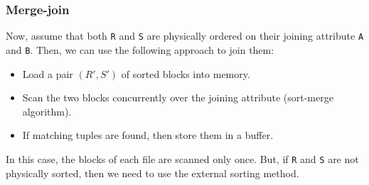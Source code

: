\documentclass[a4paper, openany]{memoir}
\theoremstyle{definition}
\theoremstyle{plain}
\newcommand{\tuplesorted}[0]{
    \draw (0, 0) -- (1.5, 0)
    -- (1.5, -4)
    -- (0, -4)
    -- cycle;

    \foreach \x/\y[count=\i] in {1/2, 2/3, 2/5, 3/8, 5/9, 5/11, 5/12, 6/13} {
        \draw (0.75, -\i*0.5) -- (0.75, -\i*0.5 + 0.5);
        \draw (0, -\i*0.5) -- (1.5, -\i*0.5);
        \filldraw[blue!30, opacity=0.3] (0.75, -\i*0.5) -- (1.5, -\i*0.5)
            -- (1.5, -\i*0.5 + 0.5)
            -- (0.75, -\i*0.5 + 0.5)
            -- cycle;
        \filldraw[red!30, opacity=0.3] (0.75, -\i*0.5) -- (0, -\i*0.5)
            -- (0, -\i*0.5 + 0.5)
            -- (0.75, -\i*0.5 + 0.5)
            -- cycle;
        \node at (0.375, -\i*0.5 + 0.25) {\texttt{\x}};
        \node at (1.125, -\i*0.5 + 0.25) {\texttt{\y}};
    }

    \draw (4.5, 0) -- (5.25, 0)
        -- (5.25, -3)
        -- (4.5, -3)
        -- cycle;
        
    \foreach \i in {1, 2, ..., 6} {
        \draw (4.5, -\i * 0.5) -- (5.25, -\i * 0.5);
        \filldraw[red!30, opacity=0.3] (4.5, -\i*0.5) -- (5.25, -\i*0.5)
            -- (5.25, -\i*0.5 + 0.5)
            -- (4.5, -\i*0.5 + 0.5)
            -- cycle;
        \node at (4.875, -\i*0.5 + 0.25) {\texttt{\i}};
    }
}
\begin{document}
\subsubsection{Merge-join}
Now, assume that both \texttt{R} and \texttt{S} are physically ordered on their joining attribute \texttt{A} and \texttt{B}. Then, we can use the following approach to join them:
\begin{itemize}
    \item Load a pair $(R', S')$ of sorted blocks into memory.
    \item Scan the two blocks concurrently over the joining attribute (sort-merge algorithm).
    \item If matching tuples are found, then store them in a buffer.
\end{itemize}
In this case, the blocks of each file are scanned only once. But, if \texttt{R} and \texttt{S} are not physically sorted, then we need to use the external sorting method.

\begin{figure}[H]
    \centering
\end{figure}

\begin{figure}[H]
    \centering
\end{figure}

\begin{figure}[H]
    \centering
\end{figure}

\begin{figure}[H]
    \centering
\end{figure}
\end{document}
